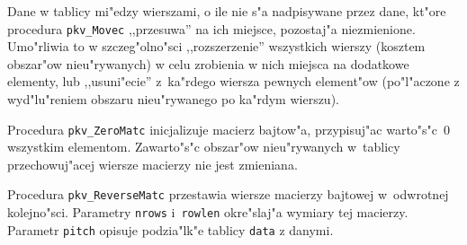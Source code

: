 Dane w tablicy mi"edzy wierszami, o ile nie s"a nadpisywane przez dane,
kt"ore procedura \texttt{pkv\_Movec} ,,przesuwa'' na ich miejsce, pozostaj"a
niezmienione. Umo"rliwia to w szczeg"olno"sci ,,rozszerzenie'' wszystkich
wierszy (kosztem obszar"ow nieu"rywanych) w celu zrobienia w nich miejsca
na dodatkowe elementy, lub ,,usuni"ecie'' z~ka"rdego wiersza pewnych
element"ow (po"l"aczone z wyd"lu"reniem obszaru nieu"rywanego po ka"rdym
wierszu).

\vspace{\bigskipamount}
Procedura \texttt{pkv\_ZeroMatc} inicjalizuje macierz bajtow"a,
przypisuj"ac warto"s"c~$0$ wszystkim elementom. Zawarto"s"c obszar"ow
nieu"rywanych w~tablicy przechowuj"acej wiersze macierzy nie jest zmieniana.

\vspace{\bigskipamount}
Procedura \texttt{pkv\_ReverseMatc} przestawia wiersze macierzy bajtowej
w~odwrotnej kolejno"sci. Parametry \texttt{nrows} i~\texttt{rowlen}
okre"slaj"a wymiary tej macierzy. Parametr \texttt{pitch} opisuje
podzia"lk"e tablicy \texttt{data} z danymi.

